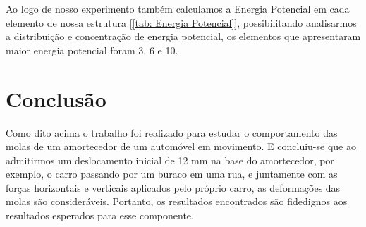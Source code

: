 \documentclass[deposito, acronym, symbols]{fei}
\begin{document}
Ao logo de nosso experimento também calculamos a Energia Potencial em cada elemento de nossa estrutura [\ref{tab: Energia Potencial}], possibilitando analisarmos a distribuição e concentração de energia potencial, os elementos que apresentaram maior energia potencial foram 3, 6 e 10.
 
\chapter{Conclusão}

Como dito acima o trabalho foi realizado para estudar o comportamento das molas de um amortecedor de um automóvel em movimento. E concluiu-se que ao admitirmos um deslocamento inicial de 12 mm na base do amortecedor, por exemplo, o carro passando por um buraco em uma rua, e juntamente com as forças horizontais e verticais aplicados pelo próprio carro, as deformações das molas são consideráveis. Portanto, os resultados encontrados são fidedignos aos resultados esperados para esse componente. 

\printbibliography[type=online]
\nocite{*}
\end{document}

